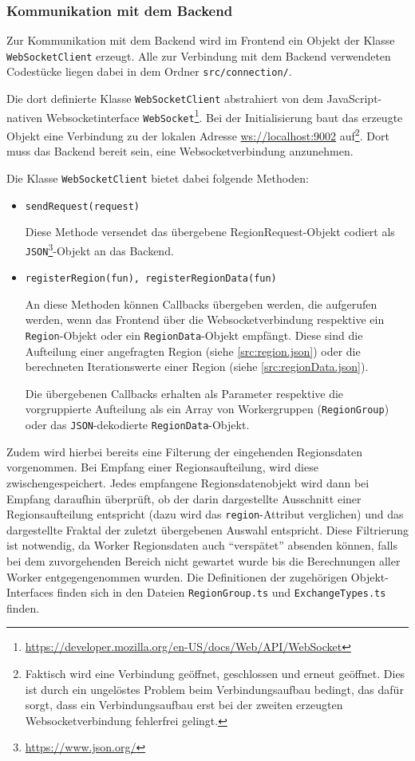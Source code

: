 \subsubsection{Kommunikation mit dem Backend}\label{sec:fontend_communication}

Zur Kommunikation mit dem Backend wird im Frontend ein Objekt der Klasse \verb|WebSocketClient| erzeugt.
Alle zur Verbindung mit dem Backend verwendeten Codestücke liegen dabei in dem Ordner \verb|src/connection/|.

Die dort definierte Klasse \verb|WebSocketClient| abstrahiert von dem JavaScript-nativen Websocketinterface \verb|WebSocket|\footnote{\url{https://developer.mozilla.org/en-US/docs/Web/API/WebSocket}}.
Bei der Initialisierung baut das erzeugte Objekt eine Verbindung zu der lokalen Adresse \url{ws://localhost:9002} auf\footnote{
	Faktisch wird eine Verbindung geöffnet, geschlossen und erneut geöffnet.
	Dies ist durch ein ungelöstes Problem beim Verbindungsaufbau bedingt, das dafür sorgt, dass ein Verbindungsaufbau
	erst bei der zweiten erzeugten Websocketverbindung fehlerfrei gelingt.
}.
Dort muss das Backend bereit sein, eine Websocketverbindung anzunehmen.

Die Klasse \verb|WebSocketClient| bietet dabei folgende Methoden:
\begin{itemize}
	\item \verb|sendRequest(request)|

	      Diese Methode versendet das übergebene RegionRequest-Objekt codiert als \verb|JSON|\footnote{\url{https://www.json.org/}}-Objekt an das Backend.
	\item \verb|registerRegion(fun), registerRegionData(fun)|

	      An diese Methoden können Callbacks übergeben werden, die aufgerufen werden, wenn das Frontend über die Websocketverbindung
	      respektive ein \texttt{Region}-Objekt oder ein \texttt{RegionData}-Objekt empfängt.
	      Diese sind die Aufteilung einer angefragten Region (siehe \autoref{src:region.json})
	      oder die berechneten Iterationswerte einer Region (siehe \autoref{src:regionData.json}).

	      Die übergebenen Callbacks erhalten als Parameter respektive die vorgruppierte Aufteilung als ein Array von Workergruppen (\texttt{RegionGroup})
	      oder das \verb|JSON|-dekodierte \verb|RegionData|-Objekt.

\end{itemize}
Zudem wird hierbei bereits eine Filterung der eingehenden Regionsdaten vorgenommen.
Bei Empfang einer Regionsaufteilung, wird diese zwischengespeichert.
Jedes empfangene Regionsdatenobjekt wird dann bei Empfang daraufhin überprüft,
ob der darin dargestellte Ausschnitt einer Regionsaufteilung entspricht (dazu wird das \verb|region|-Attribut verglichen)
und das dargestellte Fraktal der zuletzt übergebenen Auswahl entspricht.
Diese Filtrierung ist notwendig, da Worker Regionsdaten auch \enquote{verspätet} absenden können,
falls bei dem zuvorgehenden Bereich nicht gewartet wurde bis die Berechnungen aller Worker entgegengenommen wurden.
Die Definitionen der zugehörigen Objekt-Interfaces finden sich in den Dateien \verb|RegionGroup.ts| und \verb|ExchangeTypes.ts| finden.

